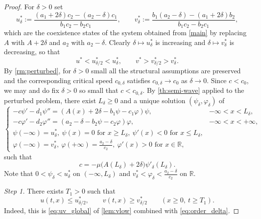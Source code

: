 \documentclass[reqno]{amsart}
\theoremstyle{plain}
\theoremstyle{definition}
\theoremstyle{remark}
\begin{document}
\begin{proof}
	For $\delta>0$ set
	\[
	u^*_\delta:=\frac{(a_1+2\delta)c_2-(a_2-\delta)c_1}{b_1c_2-b_2c_1},
	\qquad
	v^*_\delta:=\frac{b_1(a_2-\delta)-(a_1+2\delta)b_2}{b_1c_2-b_2c_1},
	\]
	which are the coexistence states of the system obtained from \eqref{main} by
	replacing $A$ with $A+2\delta$ and $a_2$ with $a_2-\delta$. Clearly
	$\delta\mapsto u^*_\delta$ is increasing and $\delta\mapsto v^*_\delta$ is
	decreasing, so that
	\begin{equation}\label{eq:order_delta}
		u^* < u^*_{\delta/2} < u^*_\delta,
		\qquad
		v^* > v^*_{\delta/2} > v^*_\delta .
	\end{equation}
	By \cref{rm:perturbed}, for $\delta>0$ small all the structural assumptions
	are preserved and the corresponding critical speed $c_{0,\delta}$ satisfies
	$c_{0,\delta}\to c_0$ as $\delta\to0$. Since $c<c_0$, we may and do fix
	$\delta>0$ so small that $c<c_{0,\delta}$. By \cref{th:semi-wave} applied to
	the perturbed problem, there exist $L_\delta\ge0$ and a unique solution
	$(\psi_\delta,\varphi_\delta)$ of
	\begin{equation}\label{aux}
		\begin{cases}
			-c \psi' - d_1 \psi'' = (A(x) +2 \delta - b_1\psi - c_1\varphi)\psi, & -\infty < x < L_\delta,\\
			-c \varphi' - d_2 \varphi'' = (a_2 - \delta - b_2\psi - c_2\varphi)\varphi, & -\infty < x < +\infty,\\
			\psi(-\infty) = u^*_\delta, ~ \psi(x)=0 \text{ for } x\ge L_\delta, ~ \psi'(x)<0 \text{ for } x\le L_\delta,\\
			\varphi(-\infty) = v^*_\delta, ~ \varphi(+\infty)=\frac{a_2 - \delta}{c_2}, ~ \varphi'(x)>0 \text{ for } x\in \mathbb{R},
		\end{cases}
	\end{equation}
	such that
	\begin{equation}\label{semi-wave-c}
		c = -\mu\big(A(L_\delta) +2 \delta\big) \psi'_{\delta}(L_\delta).
	\end{equation}
	Note that $0<\psi_\delta<u^*_\delta$ on $(-\infty,L_\delta)$ and
	$v^*_\delta<\varphi_\delta<\frac{a_2-\delta}{c_2}$ on $\mathbb{R}$.

	\textit{Step 1.} There exists $T_1>0$ such that
	\begin{equation}\label{eq:step1}
		u(t,x) \le u^*_{\delta/2},\qquad v(t,x) \ge v^*_{\delta/2}
		\qquad (x\ge0,\ t\ge T_1).
	\end{equation}
	Indeed, this is \eqref{eq:uv_global} of \cref{lem:vlow} combined with
	\eqref{eq:order_delta}.


\end{proof}
\end{document}

